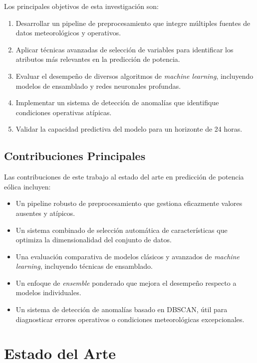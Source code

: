 \documentclass[conference]{IEEEtran}
\begin{document}
	Los principales objetivos de esta investigación son:
	
	\begin{enumerate}
		\item Desarrollar un pipeline de preprocesamiento que integre múltiples fuentes de datos meteorológicos y operativos.
		\item Aplicar técnicas avanzadas de selección de variables para identificar los atributos más relevantes en la predicción de potencia.
		\item Evaluar el desempeño de diversos algoritmos de \textit{machine learning}, incluyendo modelos de ensamblado y redes neuronales profundas.
		\item Implementar un sistema de detección de anomalías que identifique condiciones operativas atípicas.
		\item Validar la capacidad predictiva del modelo para un horizonte de 24 horas.
	\end{enumerate}
	
	\subsection{Contribuciones Principales}
	
	Las contribuciones de este trabajo al estado del arte en predicción de potencia eólica incluyen:
	
	\begin{itemize}
		\item Un pipeline robusto de preprocesamiento que gestiona eficazmente valores ausentes y atípicos.
		\item Un sistema combinado de selección automática de características que optimiza la dimensionalidad del conjunto de datos.
		\item Una evaluación comparativa de modelos clásicos y avanzados de \textit{machine learning}, incluyendo técnicas de ensamblado.
		\item Un enfoque de \textit{ensemble} ponderado que mejora el desempeño respecto a modelos individuales.
		\item Un sistema de detección de anomalías basado en DBSCAN, útil para diagnosticar errores operativos o condiciones meteorológicas excepcionales.
	\end{itemize}

	

	\section{Estado del Arte}
	
\end{document}
